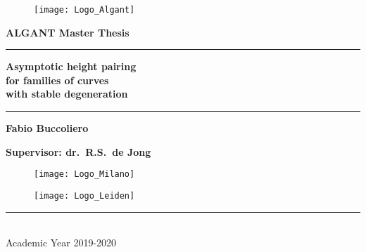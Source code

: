 \documentclass[a4paper,12 pt,titlepage,twoside]{book}
\theoremstyle{plain}
\theoremstyle{theorem}
\theoremstyle{definition}
\theoremstyle{remark}
\begin{document}
	\thispagestyle{empty}
	\begin{titlepage}
		\begin{center}
			\begin{figure}[h!]
				\centering
				\texttt{[image: Logo\_Algant]}
			\end{figure}
			\vspace{0.4cm}
			\fontsize{15pt}{0.6cm}\selectfont
			{\textbf{ALGANT Master Thesis}}
			\vspace{0.2cm}
			\rule{\linewidth}{0.3mm}
			
			\vspace{0.05cm}
			\Huge{\textbf{Asymptotic height pairing 
					\\ %
					for families of curves\\ with stable degeneration}}\\
			\vspace{0.05cm}
			
			\rule{\linewidth}{0.3mm}
			
			\vspace{0.1cm}
			
			\large{\textbf{Fabio Buccoliero}}\\
			\vspace{0.1cm}
			
			\large{\textbf{Supervisor: dr.\ R.S.\ de Jong}}
			
			\vfill
			
			\begin{figure}[h!]
				\centering
				\begin{minipage}{0.5\linewidth}
					\centering
					\texttt{[image: Logo\_Milano]}
				\end{minipage}\hfill
				\begin{minipage}{0.5\linewidth}
					\centering
					\texttt{[image: Logo\_Leiden]}
				\end{minipage}
			\end{figure}
			\rule{\linewidth}{0.2mm}\\
			\small{Academic Year 2019-2020}
		\end{center}
	\end{titlepage}
\end{document}
